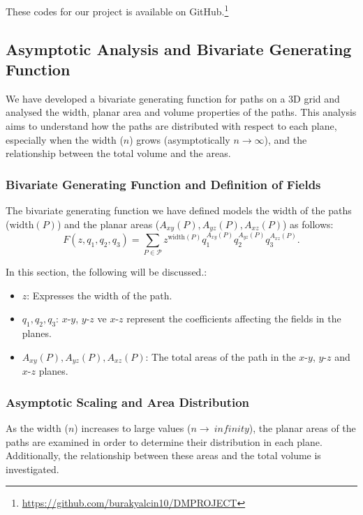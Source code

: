 \documentclass{article}
\begin{document}
These codes for our project is available on GitHub.\footnote{\url{https://github.com/burakyalcin10/DMPROJECT}}

\subsection{Asymptotic Analysis and Bivariate Generating Function}

We have developed a bivariate generating function for paths on a 3D grid and analysed the width, planar area and volume properties of the paths. This analysis aims to understand how the paths are distributed with respect to each plane, especially when the width ($n$) grows (asymptotically $n \to \infty$), and the relationship between the total volume and the areas.

\subsubsection{Bivariate Generating Function and Definition of Fields}

The bivariate generating function we have defined models the width of the paths ($\text{width}(P)$) and the planar areas ($A_{xy}(P), A_{yz}(P), A_{xz}(P)$) as follows:
\begin{equation}
    F(z, q_1, q_2, q_3) = \sum_{P \in \mathcal{P}} z^{\text{width}(P)} q_1^{A_{xy}(P)} q_2^{A_{yz}(P)} q_3^{A_{xz}(P)}.
\end{equation}

In this section, the following will be discussed.:
\begin{itemize}
    \item $z$: Expresses the width of the path.
    \item $q_1, q_2, q_3$: $x$-$y$, $y$-$z$ ve $x$-$z$ represent the coefficients affecting the fields in the planes.
    \item $A_{xy}(P), A_{yz}(P), A_{xz}(P)$: The total areas of the path in the $x$-$y$, $y$-$z$ and $x$-$z$ planes.
\end{itemize}

\subsubsection{Asymptotic Scaling and Area Distribution}

As the width ($n$) increases to large values ($n\to\ infinity$), the planar areas of the paths are examined in order to determine their distribution in each plane. Additionally, the relationship between these areas and the total volume is investigated.
\end{document}
